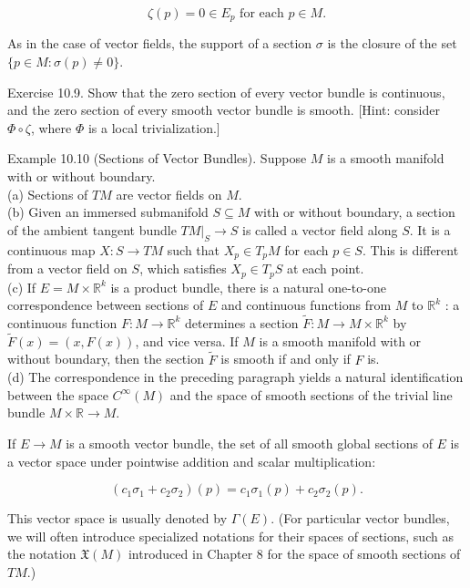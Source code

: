 \documentclass[10pt]{article}
\begin{document}
$$
\zeta(p)=0 \in E_{p} \text { for each } p \in M .
$$

As in the case of vector fields, the support of a section $\sigma$ is the closure of the set $\{p \in M: \sigma(p) \neq 0\}$.

Exercise 10.9. Show that the zero section of every vector bundle is continuous, and the zero section of every smooth vector bundle is smooth. [Hint: consider $\Phi \circ \zeta$, where $\Phi$ is a local trivialization.]

Example 10.10 (Sections of Vector Bundles). Suppose $M$ is a smooth manifold with or without boundary.\\
(a) Sections of $T M$ are vector fields on $M$.\\
(b) Given an immersed submanifold $S \subseteq M$ with or without boundary, a section of the ambient tangent bundle $\left.T M\right|_{S} \rightarrow S$ is called a vector field along $S$. It is a continuous map $X: S \rightarrow T M$ such that $X_{p} \in T_{p} M$ for each $p \in S$. This is different from a vector field on $S$, which satisfies $X_{p} \in T_{p} S$ at each point.\\
(c) If $E=M \times \mathbb{R}^{k}$ is a product bundle, there is a natural one-to-one correspondence between sections of $E$ and continuous functions from $M$ to $\mathbb{R}^{k}$ : a continuous function $F: M \rightarrow \mathbb{R}^{k}$ determines a section $\widetilde{F}: M \rightarrow M \times \mathbb{R}^{k}$ by $\widetilde{F}(x)=(x, F(x))$, and vice versa. If $M$ is a smooth manifold with or without boundary, then the section $\widetilde{F}$ is smooth if and only if $F$ is.\\
(d) The correspondence in the preceding paragraph yields a natural identification between the space $C^{\infty}(M)$ and the space of smooth sections of the trivial line bundle $M \times \mathbb{R} \rightarrow M$.

If $E \rightarrow M$ is a smooth vector bundle, the set of all smooth global sections of $E$ is a vector space under pointwise addition and scalar multiplication:

$$
\left(c_{1} \sigma_{1}+c_{2} \sigma_{2}\right)(p)=c_{1} \sigma_{1}(p)+c_{2} \sigma_{2}(p) .
$$

This vector space is usually denoted by $\Gamma(E)$. (For particular vector bundles, we will often introduce specialized notations for their spaces of sections, such as the notation $\mathfrak{X}(M)$ introduced in Chapter 8 for the space of smooth sections of $T M$.)
\end{document}
